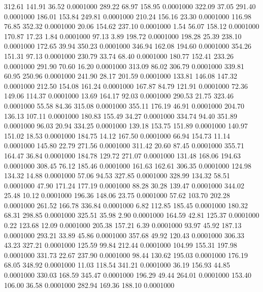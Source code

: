  312.61  141.91   36.52   0.0001000
 289.22   68.97  158.95   0.0001000
 322.09   37.05  291.40   0.0001000
 186.01  153.84  249.81   0.0001000
 210.24  156.16   23.30   0.0001000
 116.98   76.85  352.32   0.0001000
  20.06  154.62  237.10   0.0001000
   1.54   56.07  158.12   0.0001000
 170.87   17.23    1.84   0.0001000
  97.13    3.89  198.72   0.0001000
 198.28   25.39  238.10   0.0001000
 172.65   39.94  350.23   0.0001000
 346.94  162.08  194.60   0.0001000
 354.26  151.31   97.13   0.0001000
 230.79   33.74   68.40   0.0001000
 180.77  152.41  233.26   0.0001000
 291.90   70.60   16.20   0.0001000
 313.09   86.02  306.79   0.0001000
 339.81   60.95  250.96   0.0001000
 241.90   28.17  201.59   0.0001000
 133.81  146.08  147.32   0.0001000
 212.50  154.08  161.24   0.0001000
 167.87   84.79  121.91   0.0001000
  72.36  149.06  114.37   0.0001000
  13.69  164.17   92.03   0.0001000
 290.53   21.75  323.46   0.0001000
  55.58   84.36  315.08   0.0001000
 355.11  176.19   46.91   0.0001000
 204.70  136.13  107.11   0.0001000
 180.83  155.49   34.27   0.0001000
 334.74   94.40  351.89   0.0001000
  96.03   20.94  334.25   0.0001000
 139.18  153.75  151.89   0.0001000
 140.97  151.02   18.53   0.0001000
 184.75   14.12  167.50   0.0001000
  66.94  154.73   11.14   0.0001000
 145.80   22.79  271.56   0.0001000
 311.42   20.60   87.45   0.0001000
 355.71  164.47   36.84   0.0001000
 184.78  129.72  271.07   0.0001000
 131.48  168.06  194.63   0.0001000
 308.45   76.12  185.46   0.0001000
 161.63  162.61  306.35   0.0001000
 124.98  134.32   14.88   0.0001000
  57.06   94.53  327.85   0.0001000
 328.99  134.32   58.51   0.0001000
  47.90  171.24  177.19   0.0001000
  88.28   30.28  139.47   0.0001000
 344.02   25.48   10.12   0.0001000
 196.36  148.06   23.75   0.0001000
  57.62  103.70  202.28   0.0001000
 261.52  166.78  336.84   0.0001000
   6.82  112.85  185.45   0.0001000
 180.32   68.31  298.85   0.0001000
 325.51   35.98    2.90   0.0001000
 164.59   42.81  125.37   0.0001000
   0.22  123.68   12.09   0.0001000
 205.38  157.21    6.39   0.0001000
  93.97   45.92  187.13   0.0001000
 293.21   33.89   45.86   0.0001000
 357.68   49.92  120.43   0.0001000
 306.33   43.23  327.21   0.0001000
 125.59   99.84  212.44   0.0001000
 104.99  155.31  197.98   0.0001000
 331.73   22.67  237.90   0.0001000
  98.44  130.62  195.03   0.0001000
 176.19   68.05  348.92   0.0001000
  11.03  118.54  341.21   0.0001000
  36.19  156.93   44.85   0.0001000
 330.03  168.59  345.47   0.0001000
 196.29   49.44  264.01   0.0001000
 153.40  106.00   36.58   0.0001000
 282.94  169.36  188.10   0.0001000
